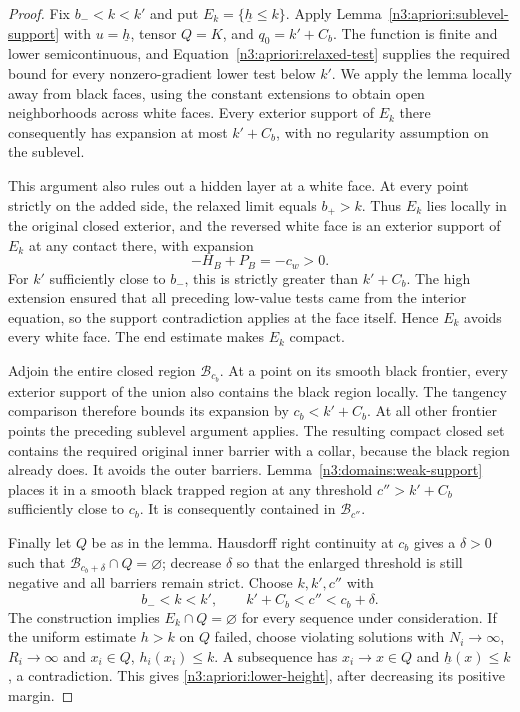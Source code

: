 \begin{proof}
Fix $b_-<k<k'$ and put $E_k=\{\underline h\le k\}$.
Apply Lemma~\ref{n3:apriori:sublevel-support} with
$u=\underline h$, tensor $Q=K$, and $q_0=k'+C_b$.
The function is finite and lower semicontinuous, and
Equation~\eqref{n3:apriori:relaxed-test} supplies the required bound
for every nonzero-gradient lower test below $k'$.  We apply the lemma
locally away from black faces, using the constant extensions to obtain
open neighborhoods across white faces.  Every exterior support of
$E_k$ there consequently has expansion at most $k'+C_b$, with no
regularity assumption on the sublevel.

This argument also rules out a hidden layer at a white face.
At every point strictly on the added side, the relaxed limit equals
$b_+>k$.  Thus $E_k$ lies locally in the original closed exterior,
and the reversed white face is an exterior support of $E_k$ at any
contact there, with expansion
\[
 -H_B+P_B=-c_w>0.
\]
For $k'$ sufficiently close to $b_-$, this is strictly greater than
$k'+C_b$.  The high extension ensured that all preceding low-value
tests came from the interior equation, so the support contradiction
applies at the face itself.  Hence $E_k$ avoids every white face.
The end estimate makes $E_k$ compact.

Adjoin the entire closed region $\mathcal B_{c_b}$.
At a point on its smooth black frontier,
every exterior support of the union also contains the black region
locally.  The tangency comparison therefore bounds its expansion by
$c_b<k'+C_b$.  At all other frontier points the preceding sublevel
argument applies.  The resulting compact closed set
contains the required original inner barrier with a collar, because
the black region already does.  It avoids the outer barriers.
Lemma~\ref{n3:domains:weak-support} places it in a smooth black trapped
region at any threshold $c''>k'+C_b$ sufficiently close to $c_b$.
It is consequently contained in $\mathcal B_{c''}$.

Finally let $Q$ be as in the lemma.  Hausdorff right continuity at
$c_b$ gives a $\delta>0$ such that
$\mathcal B_{c_b+\delta}\cap Q=\varnothing$; decrease $\delta$ so
that the enlarged threshold is still negative and all barriers
remain strict.  Choose $k,k',c''$ with
\[
 b_-<k<k',\qquad k'+C_b<c''<c_b+\delta.
\]
The construction implies $E_k\cap Q=\varnothing$ for every sequence
under consideration.  If the uniform estimate $h>k$ on $Q$ failed,
choose violating solutions with $N_i\to\infty$, $R_i\to\infty$ and
$x_i\in Q$, $h_i(x_i)\le k$.  A subsequence has $x_i\to x\in Q$
and $\underline h(x)\le k$, a contradiction.  This gives
\eqref{n3:apriori:lower-height}, after decreasing its positive margin.


\end{proof}
